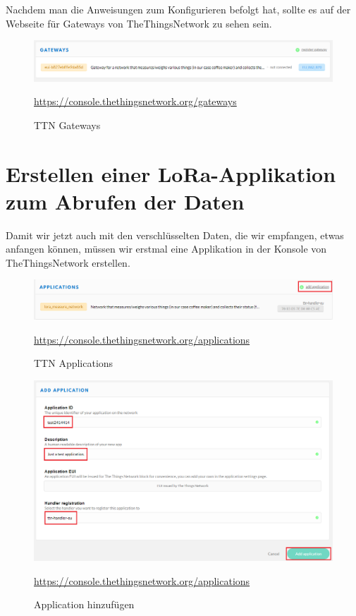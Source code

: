 Nachdem man die Anweisungen zum Konfigurieren befolgt hat, sollte es auf der Webseite für Gateways von TheThingsNetwork zu sehen sein.
\begin{figure}[ht]
    \center
    \includegraphics[width=16cm]{Bilder/lora-1.png}\\
    \caption{TTN Gateways}
    \begin{center} \quelle\url{https://console.thethingsnetwork.org/gateways} \end{center}
\end{figure}
\newpage
\section{Erstellen einer LoRa-Applikation zum Abrufen der Daten}
Damit wir jetzt auch mit den verschlüsselten Daten, die wir empfangen, etwas anfangen können, müssen wir erstmal eine Applikation in der Konsole von TheThingsNetwork erstellen. 
\begin{figure}[ht]
    \center
    \includegraphics[width=16cm]{Bilder/lora-2.png}\\
    \caption{TTN Applications}
    \begin{center} \quelle\url{https://console.thethingsnetwork.org/applications} \end{center}
\end{figure}
\begin{figure}[ht]
    \center
    \includegraphics[width=16cm]{Bilder/lora-3.png}\\
    \caption{Application hinzufügen}
    \begin{center} \quelle\url{https://console.thethingsnetwork.org/applications} \end{center}
\end{figure}
\newpage
